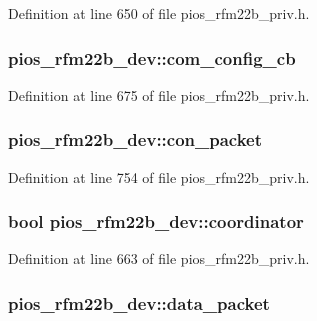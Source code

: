 \-Definition at line 650 of file pios\-\_\-rfm22b\-\_\-priv.\-h.

\hypertarget{structpios__rfm22b__dev_abed55ffe3e0e2832d958e692f9310b6e}{
\subsubsection[{com\-\_\-config\-\_\-cb}]{ {\bf pios\-\_\-rfm22b\-\_\-dev\-::com\-\_\-config\-\_\-cb}}}\label{structpios__rfm22b__dev_abed55ffe3e0e2832d958e692f9310b6e}


\-Definition at line 675 of file pios\-\_\-rfm22b\-\_\-priv.\-h.

\hypertarget{structpios__rfm22b__dev_a8bfeaddca61583fad2b2396d61d4c459}{
\subsubsection[{con\-\_\-packet}]{ {\bf pios\-\_\-rfm22b\-\_\-dev\-::con\-\_\-packet}}}\label{structpios__rfm22b__dev_a8bfeaddca61583fad2b2396d61d4c459}


\-Definition at line 754 of file pios\-\_\-rfm22b\-\_\-priv.\-h.

\hypertarget{structpios__rfm22b__dev_a37c2eab9f05656b3ef5690689b0e06c9}{
\subsubsection[{coordinator}]{\setlength{\rightskip}{0pt plus 5cm}bool {\bf pios\-\_\-rfm22b\-\_\-dev\-::coordinator}}}\label{structpios__rfm22b__dev_a37c2eab9f05656b3ef5690689b0e06c9}


\-Definition at line 663 of file pios\-\_\-rfm22b\-\_\-priv.\-h.

\hypertarget{structpios__rfm22b__dev_a19e3336c0f0c2da02404e828d688cbd3}{
\subsubsection[{data\-\_\-packet}]{ {\bf pios\-\_\-rfm22b\-\_\-dev\-::data\-\_\-packet}}}\label{structpios__rfm22b__dev_a19e3336c0f0c2da02404e828d688cbd3}


